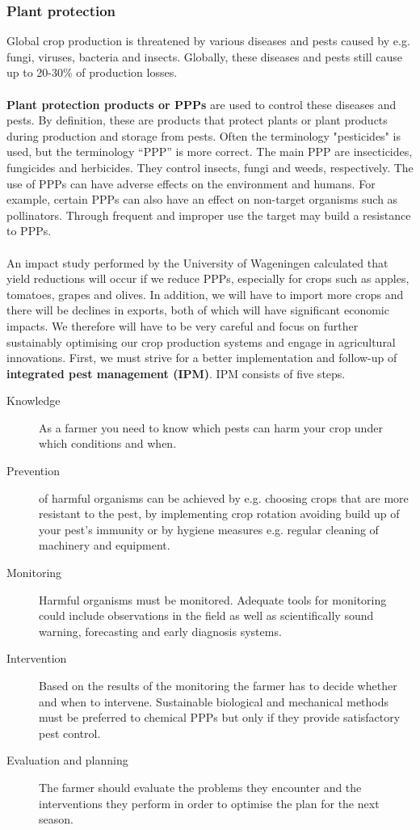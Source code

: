 \documentclass[../summary.tex]{subfiles}
\begin{document}
\subsubsection{Plant protection}

Global crop production is threatened by various diseases and pests caused by e.g. fungi, viruses, bacteria and insects. Globally, these diseases and pests still cause up to 20-30\% of production losses.
\\\\
\textbf{Plant protection products or PPPs} are used to control these diseases and pests. By definition, these are products that protect plants or plant products during production and storage from pests. Often the terminology "pesticides" is used, but the terminology “PPP” is more correct. The main PPP are insecticides, fungicides and herbicides. They control insects, fungi and weeds, respectively. The use of PPPs can have adverse effects on the environment and humans. For example, certain PPPs can also have an effect on non-target organisms such as pollinators. Through frequent and improper use the target may build a resistance to PPPs.
\\\\
An impact study performed by the University of Wageningen calculated that yield reductions will occur if we reduce PPPs, especially for crops such as apples, tomatoes, grapes and olives. In addition, we will have to import more crops and there will be declines in exports, both of which will have significant economic impacts. We therefore will have to be very careful and focus on further sustainably optimising our crop production systems and engage in agricultural innovations. First, we must strive for a better implementation and follow-up of \textbf{integrated pest management (IPM)}. IPM consists of five steps.

\begin{description}
	\item[Knowledge] As a farmer you need to know which pests can harm your crop under which conditions and when.
	\item[Prevention] of harmful organisms can be achieved by e.g. choosing crops that are more resistant to the pest, by implementing crop rotation avoiding build up of your pest's immunity or by hygiene measures e.g. regular cleaning of machinery and equipment.
	\item[Monitoring] Harmful organisms must be monitored. Adequate tools for monitoring could include observations in the field as well as scientifically sound warning, forecasting and early diagnosis systems.
	\item[Intervention] Based on the results of the monitoring the farmer has to decide whether and when to intervene. Sustainable biological and mechanical methods must be preferred to chemical PPPs but only if they provide satisfactory pest control.
	\item[Evaluation and planning] The farmer should evaluate the problems they encounter and the interventions they perform in order to optimise the plan for the next season.
\end{description}
\end{document}
